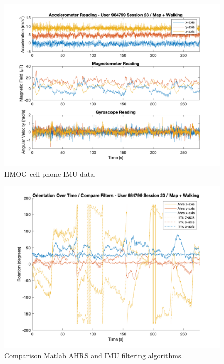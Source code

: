 \documentclass{article}
\begin{document}
\begin{figure}[ht]
  \includegraphics[width=1\linewidth]{images/984799_23_acc_mag_gyr_data.png}
  \caption[]{HMOG cell phone IMU data.}
  \label{fig:984799_23_imu}
\end{figure}

\begin{figure}[ht]
  \includegraphics[width=1\linewidth]{images/984799_23_orientation_compare_filters.png}
  \caption[]{Comparison Matlab AHRS and IMU filtering algorithms.}
  \label{fig:984799_23_compare_filter}
\end{figure}
\end{document}
